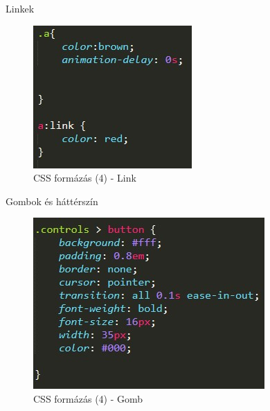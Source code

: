 \documentclass[12pt, titlepage]{article}
\begin{document}
\pagebreak

Linkek
\begin{figure}[!h]
	\centering
	\includegraphics[width=0.6\linewidth]{images/css/4.jpg}
	\caption{CSS formázás (4) - Link}
\end{figure}

Gombok és háttérszín
\begin{figure}[!h]
	\centering
	\includegraphics[width=0.6\linewidth]{images/css/5.jpg}
	\caption{CSS formázás (4) - Gomb}
\end{figure}

\pagebreak
\end{document}
